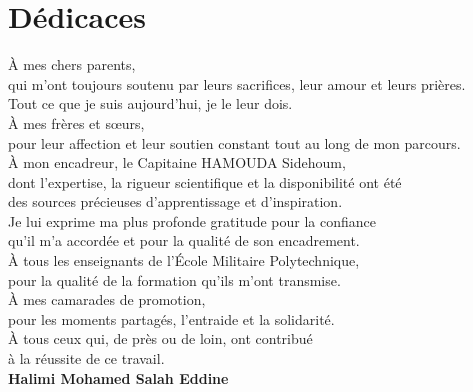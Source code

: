 \documentclass[12pt, a4paper]{report}
\begin{document}
\cleardoublepage

\chapter*{Dédicaces}
\thispagestyle{empty}

\begin{flushright}\itshape

À mes chers parents,\\
qui m'ont toujours soutenu par leurs sacrifices, leur amour et leurs prières.\\
Tout ce que je suis aujourd'hui, je le leur dois.\\[0.5cm]

À mes frères et sœurs,\\
pour leur affection et leur soutien constant tout au long de mon parcours.\\[0.5cm]

À mon encadreur, le Capitaine HAMOUDA Sidehoum,\\
dont l'expertise, la rigueur scientifique et la disponibilité ont été\\
des sources précieuses d'apprentissage et d'inspiration.\\
Je lui exprime ma plus profonde gratitude pour la confiance\\
qu'il m'a accordée et pour la qualité de son encadrement.\\[0.5cm]

À tous les enseignants de l'École Militaire Polytechnique,\\
pour la qualité de la formation qu'ils m'ont transmise.\\[0.5cm]

À mes camarades de promotion,\\
pour les moments partagés, l'entraide et la solidarité.\\[0.5cm]

À tous ceux qui, de près ou de loin, ont contribué\\
à la réussite de ce travail.\\[1cm]

\textbf{Halimi Mohamed Salah Eddine}
\end{flushright}

\cleardoublepage

\end{document}
